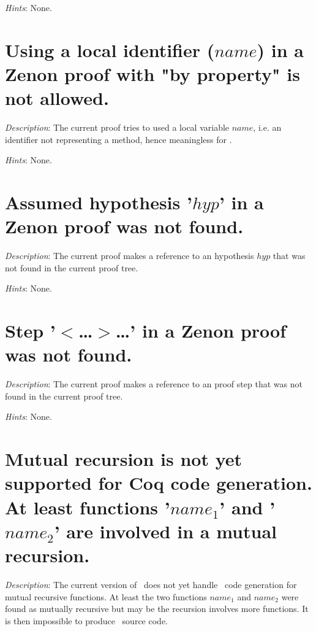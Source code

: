 {\em Hints}: None.



\section*{Using a local identifier ($name$) in a Zenon proof with "by
  property" is not allowed.}

{\em Description}: The current proof tries to used a local variable
$name$, i.e. an identifier not representing a method, hence
meaningless for \zenon.

{\em Hints}: None.



\section*{Assumed hypothesis '$hyp$' in a Zenon proof was not found.}

{\em Description}: The current proof makes a reference to an
hypothesis $hyp$ that was not found in the current proof tree.

{\em Hints}: None.



\section*{Step '$<$\ldots$>$\ldots' in a Zenon proof was not found.}

{\em Description}: The current proof makes a reference to an
proof step that was not found in the current proof tree.

{\em Hints}: None.


\section*{Mutual recursion is not yet supported for Coq code
  generation. At least functions '$name_1$' and '$name_2$' are
  involved in a mutual recursion.}

{\em Description}: The current version of \focal\ does not yet handle
\coq\ code generation for mutual recursive functions. At least the two
functions $name_1$ and $name_2$ were found as mutually recursive but
may be the recursion involves more functions. It is then impossible to
produce \coq\ source code.


